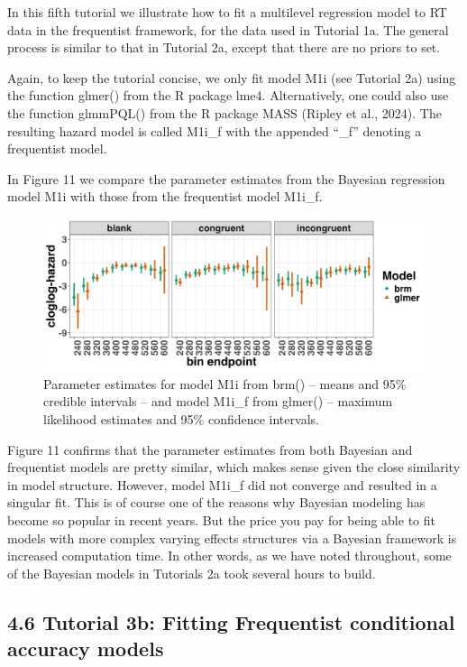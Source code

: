 \documentclass[
  man, donotrepeattitle,floatsintext]{apa6}
\begin{document}
In this fifth tutorial we illustrate how to fit a multilevel regression model to RT data in the frequentist framework, for the data used in Tutorial 1a. The general process is similar to that in Tutorial 2a, except that there are no priors to set.

Again, to keep the tutorial concise, we only fit model M1i (see Tutorial 2a) using the function glmer() from the R package lme4. Alternatively, one could also use the function glmmPQL() from the R package MASS (Ripley et al., 2024). The resulting hazard model is called M1i\_f with the appended ``\_f'' denoting a frequentist model.

In Figure 11 we compare the parameter estimates from the Bayesian regression model M1i with those from the frequentist model M1i\_f.



\begin{figure}[H]

{\centering \includegraphics[width=0.8\linewidth,height=0.67\textheight,]{../Tutorial_3_Frequentist/comparison} 

}

\caption{Parameter estimates for model M1i from brm() -- means and 95\% credible intervals -- and model M1i\_f from glmer() -- maximum likelihood estimates and 95\% confidence intervals.}\label{fig:plot-comparison}
\end{figure}

Figure 11 confirms that the parameter estimates from both Bayesian and frequentist models are pretty similar, which makes sense given the close similarity in model structure. However, model M1i\_f did not converge and resulted in a singular fit. This is of course one of the reasons why Bayesian modeling has become so popular in recent years. But the price you pay for being able to fit models with more complex varying effects structures via a Bayesian framework is increased computation time. In other words, as we have noted throughout, some of the Bayesian models in Tutorials 2a took several hours to build.

\subsection{4.6 Tutorial 3b: Fitting Frequentist conditional accuracy models}\label{tutorial-3b-fitting-frequentist-conditional-accuracy-models}
\end{document}
